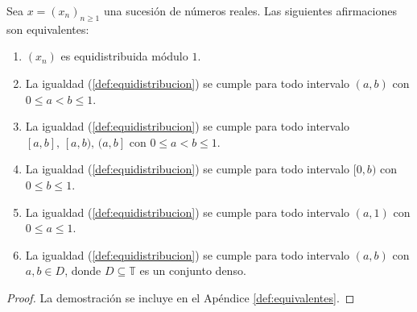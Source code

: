 \begin{proposition}
    \label{prop:equivalentes}
    Sea $x=(x_n)_{n\geq1}$ una sucesión de números reales.
    Las siguientes afirmaciones son equivalentes:
    \begin{enumerate}
        \item $(x_n)$ es equidistribuida módulo $1$.

        \item La igualdad (\ref{def:equidistribucion}) se cumple
        para todo intervalo $(a,b)$ con $0 \leq a < b \leq 1$.

        \item La igualdad (\ref{def:equidistribucion}) se cumple
        para todo intervalo $[a,b], \,[a,b), \,(a,b]$ con $0 \leq a < b \leq 1$.

        \item La igualdad (\ref{def:equidistribucion}) se cumple
        para todo intervalo $[0,b)$ con $0 \leq b \leq 1$.

        \item La igualdad (\ref{def:equidistribucion}) se cumple
        para todo intervalo $(a,1)$ con $0 \leq a \leq 1$.

        \item La igualdad (\ref{def:equidistribucion}) se cumple
        para todo intervalo $(a,b)$ con $a,b\in D$, donde $D \subseteq \mathbb{T}$ es un conjunto denso.
    \end{enumerate}
\end{proposition}

\begin{proof}
    La demostración se incluye en el Apéndice \ref{def:equivalentes}.
\end{proof}